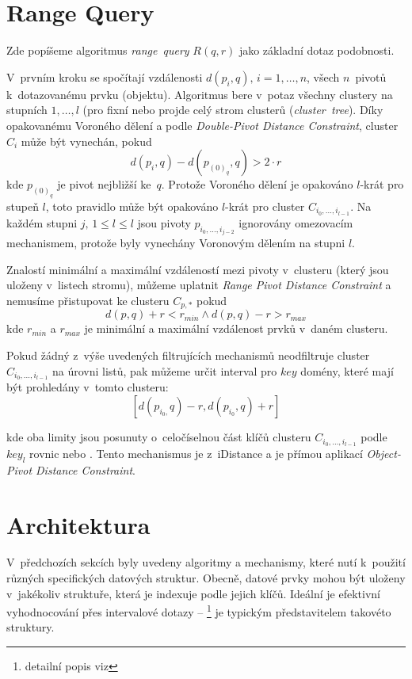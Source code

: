\section{Range Query\label{sec:Range-Query}}

Zde popíšeme algoritmus \emph{range~query} $R(q,r)$ jako základní
dotaz podobnosti.

V~prvním kroku se spočítají vzdálenosti $d(p_{i},q),\, i=1,\ldots,n$,
všech $n$~pivotů k~dotazovanému prvku (objektu)\@. Algoritmus
bere v~potaz všechny clustery na stupních $1,\ldots,l$ (pro fixní
\MIndex{} nebo projde celý strom clusterů (\emph{cluster~tree})\@.
Díky opakovanému Voroného dělení a podle \emph{Double-Pivot Distance
Constraint}\cite{similaritysearch2006}, cluster $C_{i}$ může být
vynechán, pokud
\[
d(p_{i},q)-d(p_{(0)_{q}},q)>2\cdot r
\]
kde $p_{(0)_{q}}$ je pivot nejbližší ke~$q$\@. Protože Voroného
dělení je opakováno $l$-krát pro stupeň $l$, toto pravidlo může
být opakováno $l$-krát pro cluster $C_{i_{0},\ldots,i_{l-1}}$\@.
Na každém stupni $j,\,1\leq l\leq l$ jsou pivoty $p_{i_{0},\ldots,i_{j-2}}$
ignorovány omezovacím mechanismem, protože byly vynechány Voronovým
dělením na stupni $l$\@.

Znalostí minimální a maximální vzdáleností mezi pivoty v~clusteru
(který jsou uloženy v~listech stromu), můžeme uplatnit \emph{Range Pivot
Distance Constraint}\cite{similaritysearch2006} a nemusíme přistupovat
ke clusteru $C_{p,*}$ pokud
\[
d(p,q)+r<r_{min} \wedge d(p,q)-r>r_{max}
\]
kde $r_{min}$ a $r_{max}$ je minimální a maximální vzdálenost prvků
v~daném clusteru\@.

Pokud žádný z~výše uvedených filtrujících mechanismů neodfiltruje
cluster $C_{i_{0},\ldots,i_{l-1}}$ na úrovni listů, pak můžeme určit
interval pro $key$ domény, které mají být prohledány v~tomto clusteru:
\[
[d(p_{i_{0},}q)-r,d(p_{i_{0}},q)+r]
\]

kde oba limity jsou posunuty o~celočíselnou část klíčů clusteru $C_{i_{0},\ldots,i_{l-1}}$ podle
$key_{l}$ rovnic  nebo .
Tento mechanismus je  \linebreak z~iDistance a je přímou aplikací
\emph{Object-Pivot Distance Constraint}\cite{similaritysearch2006}.

\section{Architektura }

V~předchozích sekcích byly uvedeny algoritmy a mechanismy, které
nutí k~použití různých specifických datových struktur\@. Obecně,
datové prvky mohou být uloženy v~jakékoliv struktuře, která je indexuje
podle jejich \MIndex{} klíčů. Ideální je efektivní vyhodnocování přes
intervalové dotazy -- \BPTree{}\cite{Cormen:2001:IA:580470}%
\footnote{detailní popis \BPTree{} viz %
} je typickým představitelem takovéto struktury\@.

